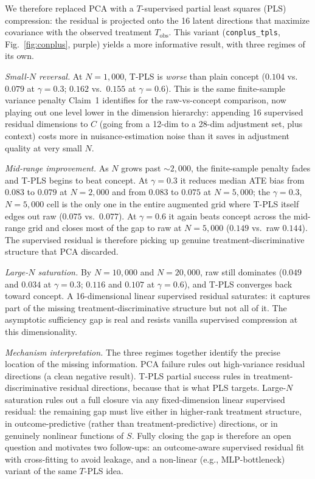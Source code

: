 \documentclass{article}
\begin{document}
We therefore replaced PCA with a $T$-supervised partial least squares (PLS)
compression: the residual is projected onto the 16 latent directions that
maximize covariance with the observed treatment $T_{\text{obs}}$. This variant
(\texttt{conplus\_tpls}, Fig.~\ref{fig:conplus}, purple) yields a more
informative result, with three regimes of its own.

\textit{Small-$N$ reversal.} At $N{=}1{,}000$, T-PLS is \emph{worse} than
plain concept ($0.104$ vs.\ $0.079$ at $\gamma{=}0.3$; $0.162$ vs.\ $0.155$ at
$\gamma{=}0.6$). This is the same finite-sample variance penalty Claim~1
identifies for the raw-vs-concept comparison, now playing out one level lower
in the dimension hierarchy: appending 16 supervised residual dimensions to
$C$ (going from a 12-dim to a 28-dim adjustment set, plus context) costs
more in nuisance-estimation noise than it saves in adjustment quality at very
small $N$.

\textit{Mid-range improvement.} As $N$ grows past $\sim\!2{,}000$, the
finite-sample penalty fades and T-PLS begins to beat concept. At
$\gamma{=}0.3$ it reduces median ATE bias from $0.083$ to $0.079$ at
$N{=}2{,}000$ and from $0.083$ to $0.075$ at $N{=}5{,}000$; the
$\gamma{=}0.3$, $N{=}5{,}000$ cell is the only one in the entire augmented
grid where T-PLS itself edges out raw ($0.075$ vs.\ $0.077$). At
$\gamma{=}0.6$ it again beats concept across the mid-range grid and closes
most of the gap to raw at $N{=}5{,}000$ ($0.149$ vs.\ raw $0.144$). The
supervised residual is therefore picking up genuine treatment-discriminative
structure that PCA discarded.

\textit{Large-$N$ saturation.} By $N{=}10{,}000$ and $N{=}20{,}000$, raw still
dominates ($0.049$ and $0.034$ at $\gamma{=}0.3$; $0.116$ and $0.107$ at
$\gamma{=}0.6$), and T-PLS converges back toward concept. A 16-dimensional
linear supervised residual saturates: it captures part of the missing
treatment-discriminative structure but not all of it. The asymptotic
sufficiency gap is real and resists vanilla supervised compression at this
dimensionality.

\textit{Mechanism interpretation.} The three regimes together identify the
precise location of the missing information. PCA failure rules out
high-variance residual directions (a clean negative result). T-PLS partial
success rules in treatment-discriminative residual directions, because that
is what PLS targets. Large-$N$ saturation rules out a full closure via any
fixed-dimension linear supervised residual: the remaining gap must live
either in higher-rank treatment structure, in outcome-predictive (rather than
treatment-predictive) directions, or in genuinely nonlinear functions of $S$.
Fully closing the gap is therefore an open question and motivates two
follow-ups: an outcome-aware supervised residual fit with cross-fitting to
avoid leakage, and a non-linear (e.g., MLP-bottleneck) variant of the same
$T$-PLS idea.
\end{document}
